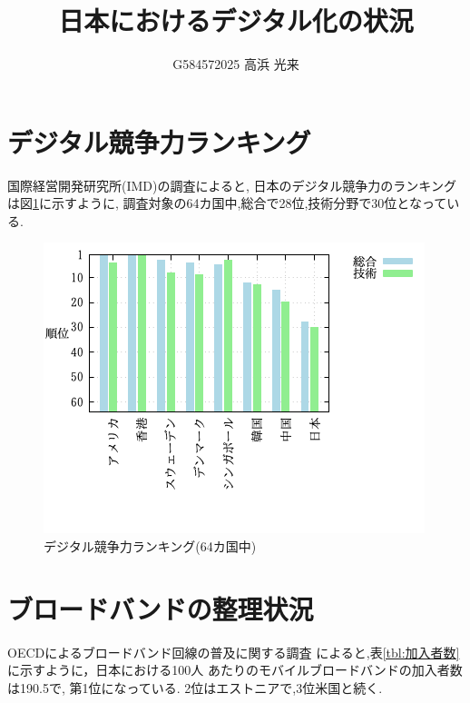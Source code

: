 \documentclass[a4paper,11pt,dvipdfmx]{ujarticle}
\title{日本におけるデジタル化の状況}
\author{G584572025 高浜 光来}
\begin{document}
\maketitle 

\section{デジタル競争力ランキング}

国際経営開発研究所(IMD)の調査\cite{imd}によると, 
日本のデジタル競争力のランキングは図\ref{zu.png}に示すように,
調査対象の64カ国中,総合で28位,技術分野で30位となっている.

\begin{figure}[htbp]
    \centering
    \includegraphics[width=0.7\linewidth]{zu.png}
    \caption{デジタル競争力ランキング(64カ国中)}\label{zu.png}
\end{figure}

\section{ブロードバンドの整理状況}

OECDによるブロードバンド回線の普及に関する調査\cite{oecd}
によると,表\ref{tbl:加入者数}に示すように，日本における100人
あたりのモバイルブロードバンドの加入者数は190.5で,
第1位になっている.
2位はエストニアで,3位米国と続く.
\end{document}
